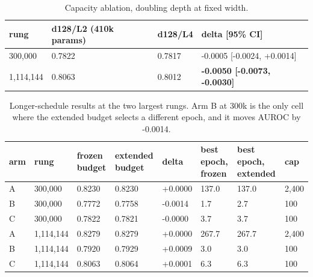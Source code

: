 \documentclass[10pt,twocolumn,letterpaper]{article}
\begin{document}
\begin{table}[!ht]
\centering
\small
\caption{Capacity ablation, doubling depth at fixed width.}
\label{tab:7}
\begin{tabular}{llll}
\toprule
rung & d128/L2 (410k params) & d128/L4 & delta [95\% CI] \\
\midrule
300,000 & 0.7822 & 0.7817 & -0.0005 [-0.0024, +0.0014] \\
1,114,144 & 0.8063 & 0.8012 & \textbf{-0.0050 [-0.0073, -0.0030]} \\
\bottomrule
\end{tabular}
\end{table}



\begin{table}[!ht]
\centering
\small
\setlength{\tabcolsep}{4pt}
\caption{Longer-schedule results at the two largest rungs. Arm B at 300k is the only cell where the extended budget selects a different epoch, and it moves AUROC by -0.0014.}
\label{tab:8}
\begin{tabular}{llllllll}
\toprule
arm & rung & frozen budget & extended budget & delta & best epoch, frozen & best epoch, extended & cap \\
\midrule
A & 300,000 & 0.8230 & 0.8230 & +0.0000 & 137.0 & 137.0 & 2,400 \\
B & 300,000 & 0.7772 & 0.7758 & -0.0014 & 1.7 & 2.7 & 100 \\
C & 300,000 & 0.7822 & 0.7821 & -0.0000 & 3.7 & 3.7 & 100 \\
A & 1,114,144 & 0.8279 & 0.8279 & +0.0000 & 267.7 & 267.7 & 2,400 \\
B & 1,114,144 & 0.7920 & 0.7929 & +0.0009 & 3.0 & 3.0 & 100 \\
C & 1,114,144 & 0.8063 & 0.8064 & +0.0001 & 6.3 & 6.3 & 100 \\
\bottomrule
\end{tabular}
\end{table}
\end{document}
